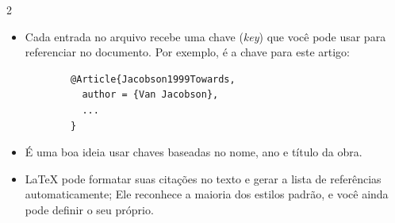 \documentclass[xcolor=table]{beamer}
\begin{document}
\begin{frame}[fragile]{\insertsubsection{} 2}
	\begin{itemize}
		\item Cada entrada no arquivo  recebe uma chave (\emph{key}) que você pode usar para referenciar no documento. Por exemplo,  é a chave para este artigo:
		\begin{verbatim}
		@Article{Jacobson1999Towards,
		  author = {Van Jacobson},
		  ...
		}
		\end{verbatim}
		\item É uma boa ideia usar chaves baseadas no nome, ano e título da obra.
		\item \LaTeX{} pode formatar suas citações no texto e gerar a lista de referências automaticamente; Ele reconhece a maioria dos estilos padrão, e você ainda pode definir o seu próprio.
	\end{itemize}
\end{frame}
\end{document}
